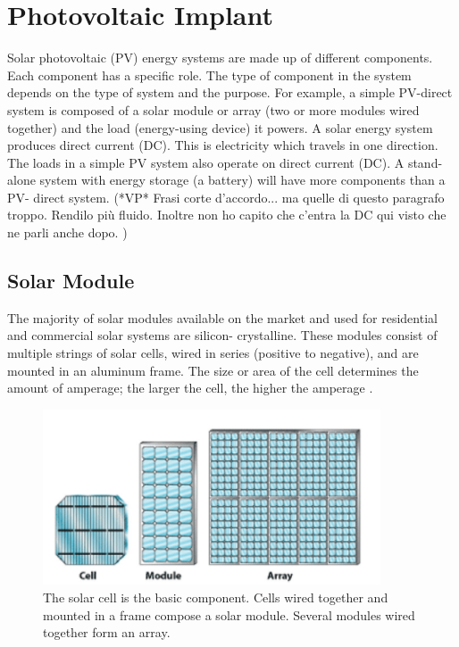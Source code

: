 \section{Photovoltaic Implant}\label{sec:pv}

Solar photovoltaic (PV) energy systems are made up of
different components. Each component has a specific role.
The type of component in the system depends on the type
of system and the purpose. For example, a simple PV-direct
system is composed of a solar module or array (two or more
modules wired together) and the load (energy-using device)
it powers. A solar energy system produces
direct current (DC)\cite{pvarizona}. This is electricity which travels in one
direction. The loads in a simple PV system also operate
on direct current (DC). A stand-alone system with energy
storage (a battery) will have more components than a PV-
direct system.
	{(*VP* Frasi corte d'accordo... ma quelle di questo paragrafo troppo. Rendilo più fluido. Inoltre non ho capito che c'entra la DC qui visto che ne parli anche dopo. )}

\subsection{Solar Module}
The majority of solar modules available on the market and
used for residential and commercial solar systems are silicon-
crystalline. These modules consist of multiple strings of solar
cells, wired in series (positive to negative), and are mounted
in an aluminum frame. The size or area of
the cell determines the amount of amperage; the larger the
cell, the higher the amperage \cite{pvarizona}.

\begin{figure}[H]
	\centering
	\includegraphics[width=10cm, keepaspectratio]{chapters/1_introduction/imgs/solarmodule.png}
	\caption{The solar cell is the basic component. Cells wired together
		and mounted in a frame compose a solar module. Several modules
		wired together form an array\cite{pvarizona}.}
	\label{fig:solmodule}
\end{figure}

